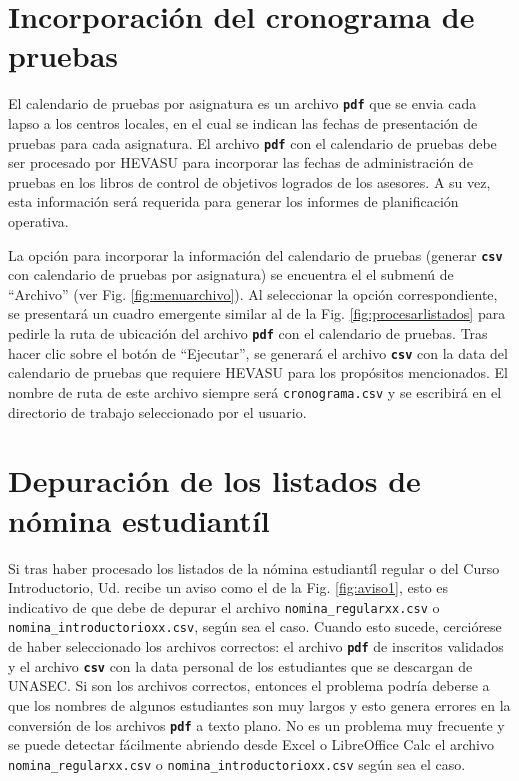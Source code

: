 \documentclass[letterpaper,12pt]{book}
\newcommand{\archivo}[1]
{\texttt{#1}}
\newcommand{\fileformat}[1]{\textbf{\texttt{#1}}}
\begin{document}
\section{Incorporación del cronograma de pruebas} \label{sec:cronograma}

El calendario de pruebas por asignatura es un archivo \fileformat{pdf} que se envia cada lapso a los centros locales, en el cual se indican las fechas de presentación de pruebas para cada asignatura. El archivo \fileformat{pdf} con el calendario de pruebas debe ser procesado por HEVASU para incorporar las fechas de administración de pruebas en los libros de control de objetivos logrados de los asesores.  A su vez, esta información será requerida para generar los informes de planificación operativa.

La opción para incorporar la información del calendario de pruebas (generar \fileformat{csv} con calendario de pruebas por asignatura) se encuentra el el submenú de ``Archivo'' (ver Fig. \ref{fig:menuarchivo}). Al seleccionar la opción correspondiente, se presentará un cuadro emergente similar al de la Fig. \ref{fig:procesarlistados} para pedirle la ruta de ubicación del archivo \fileformat{pdf} con el calendario de pruebas. Tras hacer clic sobre el botón de ``Ejecutar'', se generará el archivo \fileformat{csv} con la data del calendario de pruebas que requiere HEVASU para los propósitos mencionados. El nombre de ruta de este archivo siempre será \archivo{cronograma.csv} y se escribirá en el directorio de trabajo seleccionado por el usuario.

\section{Depuración de los listados de nómina estudiantíl} \label{sec:depuracion}

Si tras haber procesado los listados de la nómina estudiantíl regular o del Curso Introductorio, Ud. recibe un aviso como el de la Fig. \ref{fig:aviso1}, esto es indicativo de que debe de depurar el archivo \archivo{nomina\_regularxx.csv} o \archivo{nomina\_intro\-ductorioxx.csv}, según sea el caso. Cuando esto sucede, cerciórese de haber seleccionado los archivos correctos: el archivo \fileformat{pdf} de inscritos validados y el archivo \fileformat{csv} con la data personal de los estudiantes que se descargan de UNASEC.  Si son los archivos correctos, entonces el problema podría deberse a que los nombres de algunos estudiantes son muy largos y esto genera errores en la conversión de los archivos \fileformat{pdf} a texto plano. No es un problema muy frecuente y se puede detectar fácilmente abriendo desde Excel o LibreOffice Calc el archivo \archivo{nomina\_regularxx.csv} o \archivo{nomina\_introductorioxx.csv} según sea el caso.
\end{document}

